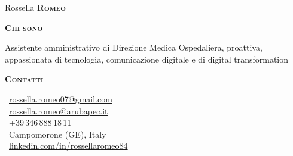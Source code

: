 \documentclass[11pt, a4paper]{article}
\newcommand{\headleft}[1]{\vspace*{3ex}\textsc{\textbf{#1}}\par%
    \vspace*{-1.5ex}\hrulefill\par\vspace*{0.7ex}}
\begin{document}
\setlength{\topskip}{0pt}
\setlength{\parindent}{0pt}
\setlength{\parskip}{0pt}
\setlength{\fboxsep}{0pt}
\pagestyle{empty}
\raggedbottom

\begin{minipage}[t]{0.33\textwidth} %
\colorbox{cvgreen!30}{\begin{minipage}[t][5mm][t]{\textwidth}\null\hfill\null\end{minipage}}

\vspace{-.2ex} %
\colorbox{cvlightgreen}{\color{cvgray}  %
\textwidth\relax%
\begin{minipage}[t][293mm][t]{0.82\textwidth}
\raggedright
\vspace*{2.5ex}

\Large Rossella \textbf{\textsc{Romeo}}
\normalsize

\begin{center}
\end{center}

\vspace*{-2.5ex}

\headleft{Chi sono}
Assistente amministrativo di Direzione Medica Ospedaliera, proattiva, appassionata di tecnologia, comunicazione digitale e di digital transformation

\headleft{Contatti}
\small %
\MVAt\ {\small \href{mailto:rossella.romeo07@gmail.com}{rossella.romeo07@gmail.com}} \\[0.4ex]
\MVAt\ {\small \href{mailto:rossella.romeo@arubapec.it}{rossella.romeo@arubapec.it}} \\[0.5ex]
\Mobilefone\ +39\,346\,888\,18\,11 \\[0.5ex]
\Letter\ Campomorone (GE), Italy \\[0.5ex]
\faLinkedin\ \href{https://www.linkedin.com/in/rossellaromeo84}{linkedin.com/in/rossellaromeo84}
\normalsize


\end{minipage}}
\end{minipage}
\end{document}
